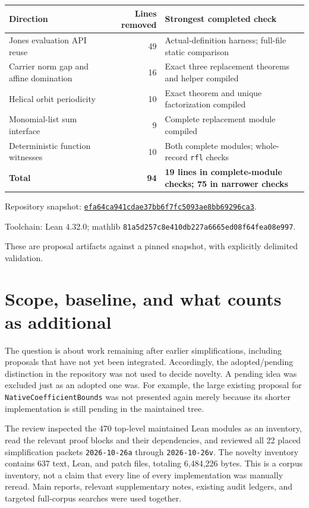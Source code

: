 \documentclass[11pt,letterpaper]{article}
\newcommand{\code}[1]{\nolinkurl{#1}}
\begin{document}
\begin{center}
\renewcommand{\arraystretch}{1.16}
\begin{tabularx}{\textwidth}{@{}>{\RaggedRight\arraybackslash}X r >{\RaggedRight\arraybackslash}p{}@{}}
\toprule
Direction & Lines removed & Strongest completed check \\
\midrule
Jones evaluation API reuse & 49 & Actual-definition harness; full-file static comparison \\
Carrier norm gap and affine domination & 16 & Exact three replacement theorems and helper compiled \\
Helical orbit periodicity & 10 & Exact theorem and unique factorization compiled \\
Monomial-list sum interface & 9 & Complete replacement module compiled \\
Deterministic function witnesses & 10 & Both complete modules; whole-record \code{rfl} checks \\
\midrule
\textbf{Total} & \textbf{94} & \textbf{19 lines in complete-module checks; 75 in narrower checks} \\
\bottomrule
\end{tabularx}
\end{center}
\vfill
{\small\color{muted}Repository snapshot: \href{https://github.com/VladimirReshetnikov/ProveIt/commit/efa64ca941cdae37bb6f7fc5093ae8bb69296ca3}{\code{efa64ca941cdae37bb6f7fc5093ae8bb69296ca3}}.\par
Toolchain: Lean 4.32.0; mathlib \code{81a5d257c8e410db227a6665ed08f64fea08e997}.\par
These are proposal artifacts against a pinned snapshot, with explicitly delimited validation.}
\newpage
\tableofcontents
\newpage

\section{Scope, baseline, and what counts as additional}

The question is about work remaining after earlier simplifications, including proposals that have not yet been integrated. Accordingly, the adopted/pending distinction in the repository was not used to decide novelty. A pending idea was excluded just as an adopted one was. For example, the large existing proposal for \code{NativeCoefficientBounds} was not presented again merely because its shorter implementation is still pending in the maintained tree.

The review inspected the 470 top-level maintained Lean modules as an inventory, read the relevant proof blocks and their dependencies, and reviewed all 22 placed simplification packets \code{2026-10-26a} through \code{2026-10-26v}. The novelty inventory contains 637 text, Lean, and patch files, totaling 6,484,226 bytes. This is a corpus inventory, not a claim that every line of every implementation was manually reread. Main reports, relevant supplementary notes, existing audit ledgers, and targeted full-corpus searches were used together.
\end{document}
